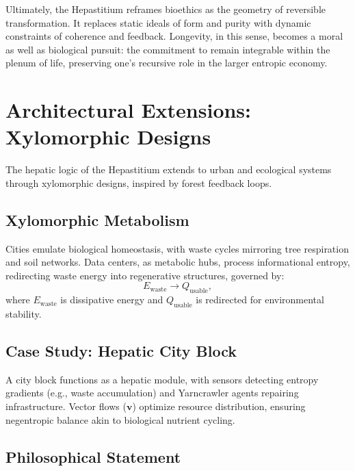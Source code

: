 \documentclass[12pt]{article}
\begin{document}
Ultimately, the Hepastitium reframes bioethics as the geometry of reversible transformation.  
It replaces static ideals of form and purity with dynamic constraints of coherence and feedback.  
Longevity, in this sense, becomes a moral as well as biological pursuit: the commitment to remain integrable within the plenum of life, preserving one’s recursive role in the larger entropic economy.

\section{Architectural Extensions: Xylomorphic Designs}
\label{sec:xylomorphic_designs}

The hepatic logic of the Hepastitium extends to urban and ecological systems through xylomorphic designs, inspired by forest feedback loops.

\subsection{Xylomorphic Metabolism}
\label{subsec:xylomorphic_metabolism}

Cities emulate biological homeostasis, with waste cycles mirroring tree respiration and soil networks. Data centers, as metabolic hubs, process informational entropy, redirecting waste energy into regenerative structures, governed by:
\begin{equation}
E_{\mathrm{waste}} \rightarrow Q_{\mathrm{usable}},
\label{eq:work_heat}
\end{equation}
where \(E_{\mathrm{waste}}\) is dissipative energy and \(Q_{\mathrm{usable}}\) is redirected for environmental stability.

\subsection{Case Study: Hepatic City Block}
\label{subsec:city_block}

A city block functions as a hepatic module, with sensors detecting entropy gradients (e.g., waste accumulation) and Yarncrawler agents repairing infrastructure. Vector flows (\(\mathbf{v}\)) optimize resource distribution, ensuring negentropic balance akin to biological nutrient cycling.

\subsection{Philosophical Statement}
\label{subsec:architectural_philosophy}
\end{document}
